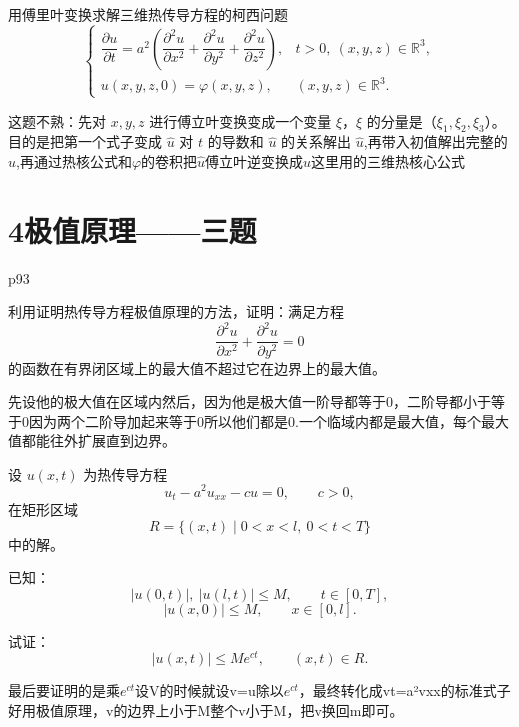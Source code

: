 \begin{homework}[3]
用傅里叶变换求解三维热传导方程的柯西问题
\[
\begin{cases}
\dfrac{\partial u}{\partial t}
=a^2\left(
\dfrac{\partial^2 u}{\partial x^2}
+\dfrac{\partial^2 u}{\partial y^2}
+\dfrac{\partial^2 u}{\partial z^2}
\right),
& t>0,\ (x,y,z)\in\mathbb R^3,\\[6pt]
u(x,y,z,0)=\varphi(x,y,z),
& (x,y,z)\in\mathbb R^3.
\end{cases}
\]
\end{homework}
\begin{dxtips}
   这题不熟：先对 $x,y,z$ 进行傅立叶变换变成一个变量 $\xi$，$\xi$ 的分量是（$\xi_1,\xi_2,\xi_3$）。目的是把第一个式子变成 $\hat{u}$ 对 $t$ 的导数和 $\hat{u}$ 的关系解出 $\hat{u}$,再带入初值解出完整的 $\hat{u}$,再通过热核公式和$\varphi$的卷积把$\hat{u}$傅立叶逆变换成$u$这里用的三维热核心公式
\end{dxtips}
\section{4极值原理——三题}
p93
\begin{homework}[2]
利用证明热传导方程极值原理的方法，证明：满足方程
\[
\frac{\partial^2 u}{\partial x^2}+\frac{\partial^2 u}{\partial y^2}=0
\]
的函数在有界闭区域上的最大值不超过它在边界上的最大值。
\end{homework}


\begin{dxtips}
    先设他的极大值在区域内然后，因为他是极大值一阶导都等于0，二阶导都小于等于0因为两个二阶导加起来等于0所以他们都是0.一个临域内都是最大值，每个最大值都能往外扩展直到边界。
\end{dxtips}


\begin{homework}[3]
设 $u(x,t)$ 为热传导方程
\[
u_t - a^2 u_{xx} - c u = 0,\qquad c>0,
\]
在矩形区域
\[
R=\{(x,t)\mid 0 < x < l,\ 0<t<T\}
\]
中的解。

已知：
\[
|u(0,t)|,\ |u(l,t)| \le M,\qquad t\in[0,T],
\]
\[
|u(x,0)|\le M,\qquad x\in[0,l].
\]

试证：
\[
|u(x,t)|\le M e^{ct},\qquad (x,t)\in R.
\]
\end{homework}
\begin{dxtips}
    最后要证明的是乘$e^{ct}$设V的时候就设v=u除以$e^{ct}$，最终转化成vt=a²vxx的标准式子好用极值原理，v的边界上小于M整个v小于M，把v换回m即可。
\end{dxtips}


